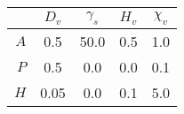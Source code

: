\begin{tabular}{r|cccc}
 & $D_v$ & $\gamma_s$ & $H_v$ & $\chi_v$ \\
\hline$A$& 0.5 & 50.0 & 0.5 & 1.0\\
$P$& 0.5 & 0.0 & 0.0 & 0.1\\
$H$& 0.05 & 0.0 & 0.1 & 5.0\\
\end{tabular}
